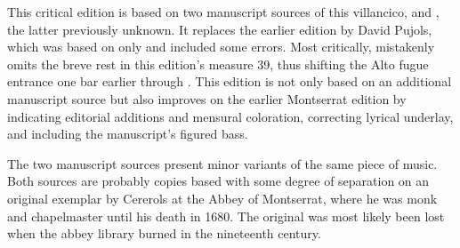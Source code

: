 
\begin{notesources}

\begin{source}
\end{source}

\begin{source}
\end{source}

\begin{source}
\end{source}

\end{notesources}

This critical edition is based on two manuscript sources of this villancico,  and , the latter previously unknown.
It replaces the earlier edition by David Pujols, which was based on  only and included some errors.
Most critically,  mistakenly omits the breve rest in this edition's measure 39, thus shifting the Alto fugue entrance one bar earlier through .
This edition is not only based on an additional manuscript source but also improves on the earlier Montserrat edition by indicating editorial additions and mensural coloration, correcting lyrical underlay, and including the manuscript's figured bass.

The two manuscript sources present minor variants of the same piece of music.
Both sources are probably copies based with some degree of separation on an original exemplar by Cererols at the Abbey of Montserrat, where he was monk and chapelmaster until his death in 1680.%
  \autocite{Bonastre:CererolsSymposium}
The original was most likely been lost when the abbey library burned in the nineteenth century.

